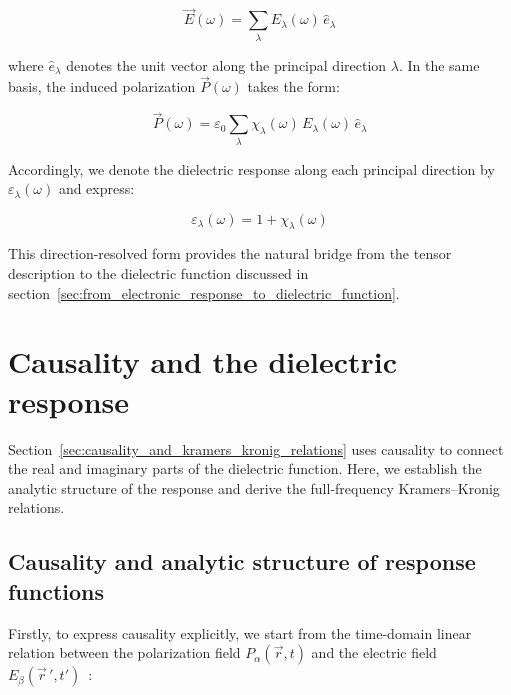 \begin{equation}
    \vec{E}(\omega)=\sum_{\lambda}E_{\lambda}(\omega)\,\hat{e}_{\lambda}
\label{electric_field_decomposition_principal_directions}
\end{equation}

where $\hat{e}_{\lambda}$ denotes the unit vector along the principal direction $\lambda$.
In the same basis, the induced polarization $\vec{P}(\omega)$ takes the form:

\begin{equation}
    \vec{P}(\omega)=\varepsilon_0\sum_{\lambda}\chi_{\lambda}(\omega)\,E_{\lambda}(\omega)\,\hat{e}_{\lambda}
\label{polarization_decomposition_principal_directions}
\end{equation}

Accordingly, we denote the dielectric response along each principal direction by $\varepsilon_{\lambda}(\omega)$ and express:

\begin{equation}
    \varepsilon_{\lambda}(\omega)=1+\chi_{\lambda}(\omega)
\label{direction_resolved_dielectric_response}
\end{equation}

This direction-resolved form provides the natural bridge from the tensor description to the dielectric function discussed in section~\ref{sec:from_electronic_response_to_dielectric_function}.

\newpage
\section{Causality and the dielectric response}
\label{sec:causality_derivation_basic}

Section~\ref{sec:causality_and_kramers_kronig_relations} uses causality to connect the real and imaginary parts of the dielectric function.
Here, we establish the analytic structure of the response and derive the full-frequency Kramers--Kronig relations.

\subsection{Causality and analytic structure of response functions}

Firstly, to express causality explicitly, 
we start from the time-domain linear relation between
the polarization field $P_{\alpha}(\vec{r},t)$ and
the electric field $E_{\beta}(\vec{r}\,',t')$~\cite{dressel2002electrodynamics}:

